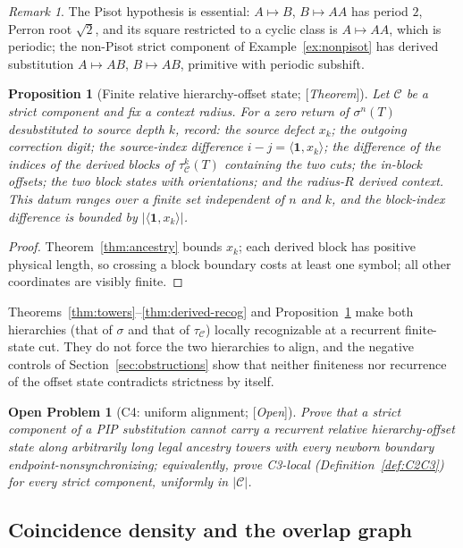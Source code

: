 \documentclass[11pt]{amsart}
\theoremstyle{plain}
\newtheorem{proposition}[theorem]{Proposition}
\newtheorem{problem}[theorem]{Open Problem}
\theoremstyle{definition}
\theoremstyle{remark}
\newtheorem{remark}[theorem]{Remark}
\newcommand{\cC}{\mathcal{C}}
\newcommand{\Status}[1]{\textup{[\textit{#1}]}}
\begin{document}
\begin{remark}
The Pisot hypothesis is essential: $A\mapsto B$, $B\mapsto AA$ has period $2$, Perron root $\sqrt2$, and its square restricted to a cyclic class is $A\mapsto AA$, which is periodic; the non-Pisot strict component of Example~\ref{ex:nonpisot} has derived substitution $A\mapsto AB$, $B\mapsto AB$, primitive with periodic subshift.
\end{remark}

\begin{proposition}[Finite relative hierarchy-offset state; \Status{Theorem}]\label{prop:offset}
Let $\cC$ be a strict component and fix a context radius. For a zero return of $\sigma^n(T)$ desubstituted to source depth $k$, record: the source defect $x_k$; the outgoing correction digit; the source-index difference $i-j=\langle\mathbf1,x_k\rangle$; the difference of the indices of the derived blocks of $\tau_\cC^k(T)$ containing the two cuts; the in-block offsets; the two block states with orientations; and the radius-$R$ derived context. This datum ranges over a finite set independent of $n$ and $k$, and the block-index difference is bounded by $|\langle\mathbf1,x_k\rangle|$.
\end{proposition}
\begin{proof}
Theorem~\ref{thm:ancestry} bounds $x_k$; each derived block has positive physical length, so crossing a block boundary costs at least one symbol; all other coordinates are visibly finite.
\end{proof}

Theorems~\ref{thm:towers}--\ref{thm:derived-recog} and Proposition~\ref{prop:offset} make both hierarchies (that of $\sigma$ and that of $\tau_\cC$) locally recognizable at a recurrent finite-state cut. They do not force the two hierarchies to align, and the negative controls of Section~\ref{sec:obstructions} show that neither finiteness nor recurrence of the offset state contradicts strictness by itself.

\begin{problem}[C4: uniform alignment; \Status{Open}]\label{prob:C4}
Prove that a strict component of a PIP substitution cannot carry a recurrent relative hierarchy-offset state along arbitrarily long legal ancestry towers with every newborn boundary endpoint-nonsynchronizing; equivalently, prove C3-local (Definition~\ref{def:C2C3}) for every strict component, uniformly in $|\cC|$.
\end{problem}

\subsection{Coincidence density and the overlap graph}\label{sec:density}
\end{document}
